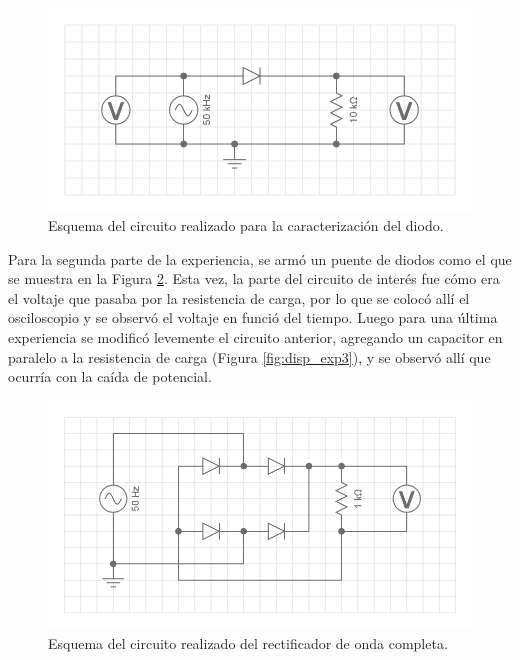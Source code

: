 \documentclass[twoside,twocolumn,a4paper]{article}
\begin{document}
\begin{figure}[H]
\includegraphics[width=\linewidth]{disp_exp.png}
\captionsetup{justification=centering}
\caption{Esquema del circuito realizado para la caracterizaci\'on del diodo.}
\label{fig:dsp_exp}
\end{figure}

Para la segunda parte de la experiencia, se arm\'o un puente de diodos como el que se muestra en la Figura \ref{fig:disp_exp2}. Esta vez, la parte del circuito de inter\'es fue c\'omo era el voltaje que pasaba por la resistencia de carga, por lo que se coloc\'o all\'i el osciloscopio y se observ\'o el voltaje en funci\'o del tiempo. Luego para una \'ultima experiencia se modific\'o levemente el circuito anterior, agregando un capacitor en paralelo a la resistencia de carga (Figura \ref{fig:disp_exp3}), y se observ\'o all\'i que ocurr\'ia con la ca\'ida de potencial. 

\begin{figure}[h]
\includegraphics[width=\linewidth]{disp_exp2.png}
\captionsetup{justification=centering}
\caption{Esquema del circuito realizado del rectificador de onda completa.}
\label{fig:disp_exp2}
\end{figure}
\end{document}
